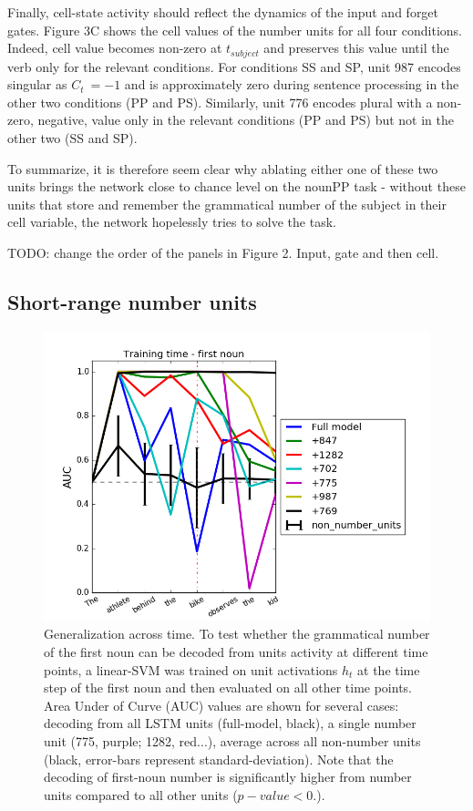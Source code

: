 Finally, cell-state activity should reflect the dynamics of the input and forget gates. Figure 3C shows the cell values of the number units for all four conditions. Indeed, cell value becomes non-zero at $t_{subject}$ and preserves this value until the verb only for the relevant conditions. For conditions SS and SP, unit 987 encodes singular as $C_t ~= -1$ and is approximately zero during sentence processing in the other two conditions (PP and PS). Similarly, unit 776 encodes plural with a non-zero, negative, value only in the relevant conditions (PP and PS) but not in the other two (SS and SP).

To summarize, it is therefore seem clear why ablating either one of these two units brings the network close to chance level on the nounPP task - without these units that store and remember the grammatical number of the subject in their cell variable, the network hopelessly tries to solve the task.

TODO: change the order of the panels in Figure 2. Input, gate and then cell. 

\subsection{Short-range number units}
\lipsum[1]

\begin{figure}
\centering
\includegraphics[width=\linewidth]{Figures/Figure3_number_units_GAT.png}
\caption{Generalization across time. To test whether the grammatical number of the first noun can be decoded from units activity at different time points, a linear-SVM was trained on unit activations $h_t$ at the time step of the first noun and then evaluated on all other time points. Area Under of Curve (AUC) values are shown for several cases: decoding from all LSTM units (full-model, black), a single number unit (775, purple; 1282, red...), average across all non-number units (black, error-bars represent standard-deviation). Note that the decoding of first-noun number is significantly higher from number units compared to all other units ($p-value<0.$).}
\end{figure}


